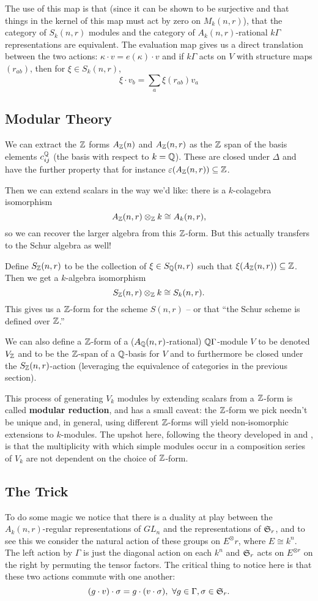 \documentclass[12pt]{article}
\DeclareMathOperator{\1}{\mathbbm{1}}
\begin{document}
The use of this map is that (since it can be shown to be surjective and that things in the kernel of this map must act by zero on $M_k(n,r)$), that the category
of $S_k(n,r)$ modules and the category of $A_k(n,r)$-rational $k\Gamma$ representations are equivalent. The evaluation map gives us a direct translation between 
the two actions: $\kappa\cdot v=e(\kappa)\cdot v$ and if $k\Gamma$ acts on $V$ with structure maps $(r_{ab})$, then for $\xi\in S_k(n,r)$,
\[\xi\cdot v_b=\sum_a \xi(r_{ab})v_a\]

\subsection{Modular Theory}
We can extract the $\mathbb{Z}$ forms $A_{\mathbb{Z}}(n)$ and $A_{\mathbb{Z}}(n,r)$ as the $\mathbb{Z}$ span of the basis elements $c_{ij}^{\mathbb{Q}}$ (the basis with respect to $k=\mathbb{Q}$). These 
are closed under $\Delta$ and have the further property that for instance $\varepsilon(A_{\mathbb{Z}}(n,r))\subseteq\mathbb{Z}$.

Then we can extend scalars in the way we'd like: there is a $k$-colagebra isomorphism 
\[A_{\mathbb{Z}}(n,r)\otimes_{\mathbb{Z}} k\cong A_k(n,r),\] 
so we can recover the larger algebra from this $\mathbb{Z}$-form. But this actually transfers to the Schur algebra as well!

Define $S_{\mathbb{Z}}(n,r)$ to be the collection of $\xi\in S_{\mathbb{Q}}(n,r)$ such that $\xi(A_{\mathbb{Z}}(n,r))\subseteq\mathbb{Z}$. Then we get a $k$-algebra isomorphism
\[S_{\mathbb{Z}}(n,r)\otimes_{\mathbb{Z}} k\cong S_k(n,r).\]
This gives us a $\mathbb{Z}$-form for the scheme $S(n,r)$ -- or that ``the Schur scheme is defined over $\mathbb{Z}$.''

We can also define a $\mathbb{Z}$-form of a ($A_{\mathbb{Q}}(n,r)$-rational) $\mathbb{Q}\Gamma$-module $V$ to be denoted $V_{\mathbb{Z}}$ and to be the $\mathbb{Z}$-span of a $\mathbb{Q}$-basis for $V$
and to furthermore be closed under the $S_{\mathbb{Z}}(n,r)$-action (leveraging the equivalence of categories in the previous section).

This process of generating $V_k$ modules by extending scalars from a $\mathbb{Z}$-form is called \textbf{modular reduction}, and has a small caveat:
the $\mathbb{Z}$-form we pick needn't be unique and, in general, using different $\mathbb{Z}$-forms will yield non-isomorphic extensions to $k$-modules. The upshot here,
following the theory developed in \cite{brauer} and \cite{green-locFinReps}, is that the multiplicity with which simple modules occur in a composition series of $V_k$
are not dependent on the choice of $\mathbb{Z}$-form.

\subsection{The Trick}
To do some magic we notice that there is a duality at play between the $A_k(n,r)$-regular representations of $GL_n$ and the representations of $\mathfrak{S}_r$, 
and to see this we consider the natural action of these groups on $E^\otimes r$, where $E\cong k^n$. The left action by $\Gamma$ is just the diagonal action 
on each $k^n$ and $\mathfrak{S}_r$ acts on $E^{\otimes r}$ on the right by permuting the tensor factors. The critical thing to notice here is that these two 
actions commute with one another:
\[(g\cdot v)\cdot\sigma=g\cdot(v\cdot\sigma),\ \forall g\in\Gamma, \sigma\in\frakS_r.\]

\medskip

\printbibliography
\end{document}
